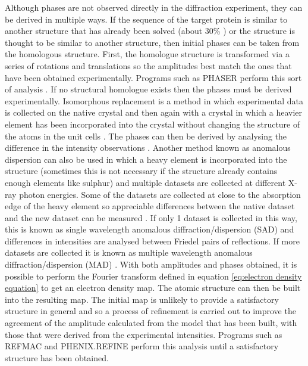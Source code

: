         Although phases are not observed directly in the diffraction experiment, they can be derived in multiple ways. If the sequence of the target protein is similar to another structure that has already been solved (about 30\% \cite{zeldin2013thesis}) or the structure is thought to be similar to another structure, then initial phases can be taken from the homologous structure. First, the homologue structure is transformed via a series of rotations and translations so the amplitudes best match the ones that have been obtained experimentally. Programs such as PHASER perform this sort of analysis \cite{mccoy2007phaser}.
        \newline
        If no structural homologue exists then the phases must be derived experimentally. Isomorphous replacement is a method in which experimental data is collected on the native crystal and then again with a crystal in which a heavier element has been incorporated into the crystal without changing the structure of the atoms in the unit cells \cite{perutz1956isomorphous}. The phases can then be derived by analysing the difference in the intensity observations \cite{taylor2010}.
        \newline
        Another method known as anomalous dispersion can also be used in which a heavy element is incorporated into the structure (sometimes this is not necessary if the structure already contains enough elements like sulphur) and multiple datasets are collected at different X-ray photon energies.
        Some of the datasets are collected at close to the absorption edge of the heavy element so appreciable differences between the native dataset and the new dataset can be measured \cite{bijvoet1954structure}.
        If only 1 dataset is collected in this way, this is known as single wavelength anomalous diffraction/dispersion (SAD) and differences in intensities are analysed between Friedel pairs of reflections.
        If more datasets are collected it is known as multiple wavelength anomalous diffraction/dispersion (MAD) \cite{hendrickson1991determination,taylor2010}.
        \newline
        With both amplitudes and phases obtained, it is possible to perform the Fourier transform defined in equation \ref{eq:electron density equation} to get an electron density map.
        The atomic structure can then be built into the resulting map.
        The initial map is unlikely to provide a satisfactory structure in general and so a process of refinement is carried out to improve the agreement of the amplitude calculated from the model that has been built, with those that were derived from the experimental intensities.
        Programs such as REFMAC \cite{murshudov2011refmac5} and PHENIX.REFINE \cite{adams2010phenix} perform this analysis until a satisfactory structure has been obtained.

